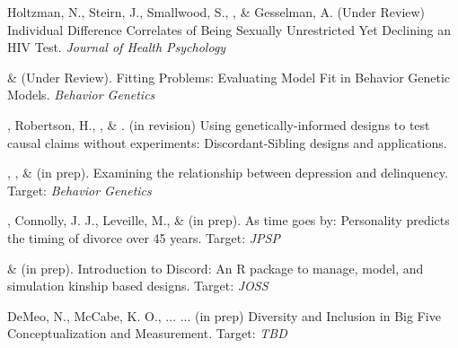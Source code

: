 

\item Holtzman, N., Steirn, J., Smallwood, S., \meb, \& Gesselman, A. (Under Review) Individual Difference Correlates of Being Sexually Unrestricted Yet Declining an HIV Test. \textit{Journal of Health Psychology}

\item \meb \& \joe (Under Review). Fitting Problems: Evaluating Model Fit in Behavior Genetic Models. \textit{Behavior Genetics}


\item \meb, Robertson, H.\noteA, \jt, \& \joe. (in revision) Using genetically-informed designs to test causal claims without experiments: Discordant-Sibling designs and applications. \href{https://osf.io/zpdwt/}{\small\color{blue}{osf.io/zpdwt/}}%


\item \emsims, \jt, \& \meb (in prep). Examining the relationship between depression and delinquency. Target: \textit{Behavior Genetics}

\item \meb, Connolly, J. J., Leveille, M., \& \jjj (in prep). As time goes by: Personality predicts the timing of divorce over 45 years. Target: \textit{JPSP}
%


\item \jt \& \meb (in prep). Introduction to Discord: An R package to manage, model, and simulation kinship based designs. Target: \textit{JOSS}

\item DeMeo, N., McCabe, K. O., ... \meb ... (in prep) Diversity and Inclusion in Big Five Conceptualization and Measurement.  Target: \textit{TBD}






